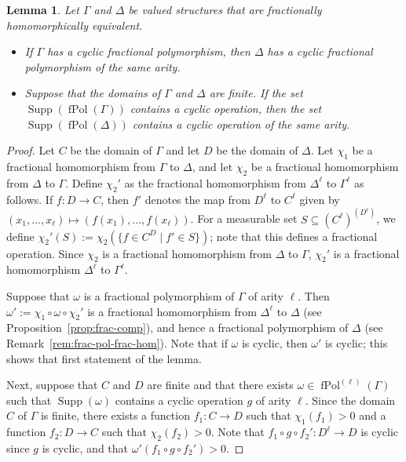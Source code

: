 \documentclass[nonacm]{acmart}
\DeclareMathOperator{\fPol}{fPol}
\DeclareMathOperator{\Sup}{Supp}
\newtheorem{lemma}[theorem]{Lemma}
\begin{document}
\begin{lemma}\label{lem:h1-transfer}
Let $\Gamma$ and $\Delta$ be valued structures 
that are fractionally homomorphically equivalent. 
\begin{itemize}
    \item If $\Gamma$ has a cyclic fractional polymorphism, then $\Delta$ has a cyclic fractional polymorphism of the same arity.
    \item Suppose that the domains of $\Gamma$ and $\Delta$ are finite. If the set $\Sup(\fPol(\Gamma))$ contains a cyclic operation, then the set $\Sup(\fPol(\Delta))$ contains a cyclic operation of the same arity. 
\end{itemize}
\end{lemma}
\begin{proof}
Let $C$ be the domain of $\Gamma$ and let $D$ be the domain of $\Delta$. Let $\chi_1$ be a fractional homomorphism from $\Gamma$ to $\Delta$, and let $\chi_2$ be a fractional homomorphism from $\Delta$ to $\Gamma$.
Define $\chi_2'$ as the fractional homomorphism 
from $\Delta^{\ell}$ to $\Gamma^{\ell}$
as follows. 
If $f \colon D \to C$, then $f'$ denotes the map from $D^{\ell}$ to $C^{\ell}$ given by 
$(x_1,\dots,x_{\ell}) \mapsto (f(x_1),\dots,f(x_{\ell}))$. 
For a measurable set $S \subseteq (C^\ell)^{(D^\ell)}$, we define  $\chi_2'(S) := \chi_2(\{f \in C^D \mid f' \in S\})$; note that this defines a fractional operation. Since $\chi_2$ is a fractional homomorphism from $\Delta$ to $\Gamma$, $\chi_2'$ is a fractional homomorphism $\Delta^\ell$ to $\Gamma^\ell$. 

Suppose that $\omega$ is a fractional polymorphism of $\Gamma$ of arity $\ell$. 
Then $\omega' := \chi_1 \circ \omega \circ \chi_2'$ is a fractional homomorphism 
from $\Delta^{\ell}$ to $\Delta$ (see Proposition~\ref{prop:frac-comp}), 
and hence a fractional polymorphism of $\Delta$ (see Remark~\ref{rem:frac-pol-frac-hom}).
Note that if $\omega$ is cyclic, then $\omega'$ is cyclic; this shows that first statement of the lemma. 

Next, suppose that $C$ and $D$ are finite and  that there exists $\omega \in \fPol^{(\ell)}(\Gamma)$  such that $\Sup(\omega)$ contains a cyclic operation $g$ of arity $\ell$.  
Since the domain $C$ of $\Gamma$ is finite, there exists a function $f_1 \colon C \to D$ such that $\chi_1(f_1) > 0$ and a function $f_2 \colon D \to C$ such that $\chi_2(f_2)>0$. 
Note that $f_1 \circ g \circ f_2' \colon D^{\ell}\to D$ is cyclic since $g$ is cyclic, and that $\omega'(f_1 \circ g \circ f_2') > 0$. 
\end{proof}
\end{document}
